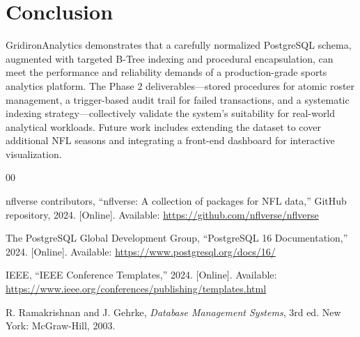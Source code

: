 \documentclass[conference]{IEEEtran}
\begin{document}
\section{Conclusion}

GridironAnalytics demonstrates that a carefully normalized PostgreSQL schema, augmented with targeted B-Tree indexing and procedural encapsulation, can meet the performance and reliability demands of a production-grade sports analytics platform. The Phase 2 deliverables—stored procedures for atomic roster management, a trigger-based audit trail for failed transactions, and a systematic indexing strategy—collectively validate the system's suitability for real-world analytical workloads. Future work includes extending the dataset to cover additional NFL seasons and integrating a front-end dashboard for interactive visualization.

\begin{thebibliography}{00}

nflverse contributors, ``nflverse: A collection of packages for NFL data,'' GitHub repository, 2024. [Online]. Available: \url{https://github.com/nflverse/nflverse}

The PostgreSQL Global Development Group, ``PostgreSQL 16 Documentation,'' 2024. [Online]. Available: \url{https://www.postgresql.org/docs/16/}

IEEE, ``IEEE Conference Templates,'' 2024. [Online]. Available: \url{https://www.ieee.org/conferences/publishing/templates.html}

R. Ramakrishnan and J. Gehrke, \textit{Database Management Systems}, 3rd ed. New York: McGraw-Hill, 2003.

\end{thebibliography}
\end{document}
